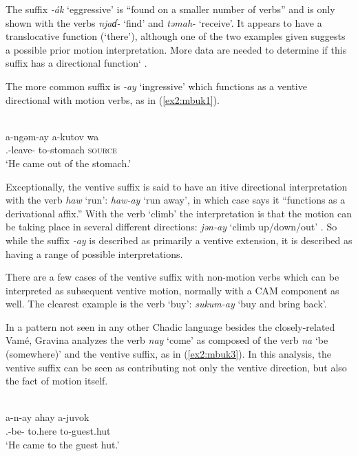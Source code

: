 The suffix \textit{-ák} `eggressive' is ``found on a smaller number of verbs'' and is only shown with the verbs \textit{njaɗ-} `find' and \textit{təmah-} `receive'. It appears to have a translocative function (`there'), although one of the two examples given suggests a possible prior motion interpretation. More data are needed to determine if this suffix has a directional function`   . 

The more common suffix is \textit{-ay} `ingressive' which functions as a ventive directional with motion verbs, as in (\ref{ex2:mbuk1}).

\ea\label{ex2:mbuk1}
 \\
\gll a-ngəm-ay a-kutov wa	\\
.-leave- to-stomach \textsc{source}	\\
\glt `He came out of the stomach.'
\z

Exceptionally, the ventive suffix is said to have an itive directional interpretation with the verb \textit{haw} `run': \textit{haw-ay} `run away', in which case \citet[7]{gravinaVerbPhraseMbuko2001} says it ``functions as a derivational affix.''  With the verb `climb' the interpretation is that the motion can be taking place in several different directions: \textit{jən-ay} `climb up/down/out' \citep[8]{gravinaVerbPhraseMbuko2001}. So while the suffix \textit{-ay} is described as primarily a ventive extension, it is described as having a range of possible interpretations.
 
There are a few cases of the ventive suffix with non-motion verbs which can be interpreted as subsequent ventive motion, normally with a CAM component as well. The clearest example is the verb `buy': \textit{sukum-ay} `buy and bring back'. 

In a pattern not seen in any other Chadic language besides the closely-related Vamé, Gravina analyzes the verb \textit{nay} `come' as composed of the verb \textit{na} `be (somewhere)' and the ventive suffix, as in (\ref{ex2:mbuk3}). In this analysis, the ventive suffix can be seen as contributing not only the ventive direction, but also the fact of motion itself.

\ea\label{ex2:mbuk3}
 \\
\gll a-n-ay ahay a-juvok \\	
.-be- to.here to-guest.hut	\\
\glt `He came to the guest hut.'
\z 

